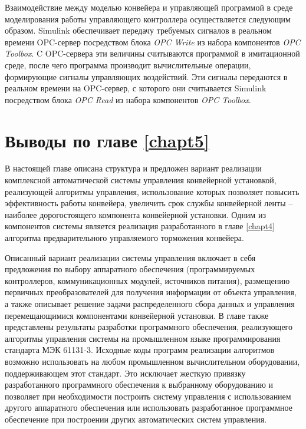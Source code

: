 Взаимодействие между моделью конвейера и управляющей программой в среде моделирования работы управляющего контроллера осуществляется следующим образом. Simulink обеспечивает передачу требуемых сигналов в реальном времени OPC-сервер посредством блока \textit{OPC Write} из набора компонентов \textit{OPC Toolbox}. C OPC-сервера эти величины считываются программой в имитационной среде, после чего программа производит вычислительные операции, формирующие сигналы управляющих воздействий. Эти сигналы передаются в реальном времени на OPC-сервер, с которого они считывается Simulink посредством блока \textit{OPC Read} из набора компонентов \textit{OPC Toolbox}.

\section{Выводы по главе \ref{chapt5}} \label{sect5_5}

В настоящей главе описана структура и предложен вариант реализации комплексной автоматической системы управления конвейерной установкой, реализующей алгоритмы управления, использование которых позволяет повысить эффективность работы конвейера, увеличить срок службы конвейерной ленты -- наиболее дорогостоящего компонента конвейерной установки. Одним из компонентов системы является реализация разработанного в главе \ref{chapt4} алгоритма предварительного управляемого торможения конвейера. 

Описанный вариант реализации системы управления включает в себя предложения по выбору аппаратного обеспечения (программируемых контроллеров, коммуникационных модулей, источников питания), размещению первичных преобразователей для получения информации от объекта управления, а также описывает решение задачи распределенного сбора данных и управления перемещающимися компонентами конвейерной установки. В главе также представлены результаты разработки программного обеспечения, реализующего алгоритмы управления системы на промышленном языке программирования стандарта МЭК 61131-3. Исходные коды программ реализации алгоритмов возможно использовать на любом промышленном вычислительном оборудовании, поддерживающем этот стандарт. Это исключает жесткую привязку разработанного программного обеспечения к выбранному оборудованию и позволяет при необходимости построить систему управления с использованием другого аппаратного обеспечения или использовать  разработанное программное обеспечение при построении других автоматических систем управления.